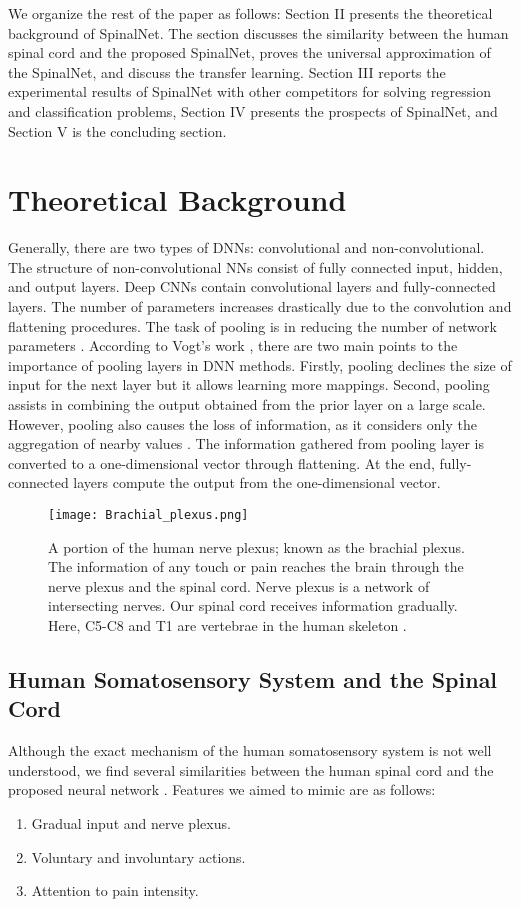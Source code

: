 \documentclass[journal]{IEEEtran}
\begin{document}
We organize the rest of the paper as follows: Section II presents the theoretical background of SpinalNet. The section discusses the similarity between the human spinal cord and the proposed SpinalNet, proves the universal approximation of the SpinalNet, and discuss the transfer learning. Section III reports the experimental results of SpinalNet with other competitors for solving regression and classification problems, Section IV presents the prospects of SpinalNet, and Section V is the concluding section.

\section{Theoretical Background}
Generally, there are two types of DNNs: convolutional and non-convolutional. The structure of non-convolutional NNs consist of fully connected input, hidden, and output layers. Deep CNNs contain convolutional layers and fully-connected layers. The number of parameters increases drastically due to the convolution and flattening procedures. The task of pooling is in reducing the number of network parameters \cite{wiatowski2017mathematical}. According to Vogt's work \cite{vogt2019overview}, there are two main points to the importance of pooling layers in DNN methods. Firstly, pooling declines the size of input for the next layer but it allows learning more mappings. Second, pooling assists in combining the output obtained from the prior layer on a large scale. However, pooling also causes the loss of information, as it considers only the aggregation of nearby values \cite{xie2015simple, vogt2019overview}. The information gathered from pooling layer is converted to a one-dimensional vector through flattening. At the end, fully-connected layers compute the output from the one-dimensional vector.

\begin{figure}
  \centering
  \texttt{[image: Brachial\_plexus.png]}
  \caption{A portion of the human nerve plexus; known as the brachial plexus. The information of any touch or pain reaches the brain through the nerve plexus and the spinal cord. Nerve plexus is a network of intersecting nerves. Our spinal cord receives information gradually. Here, C5-C8 and T1 are vertebrae in the human skeleton \cite{chang2019vascularized}.}
  \label{Hsensory}
\end{figure}

\subsection{Human Somatosensory System and the Spinal Cord}
Although the exact mechanism of the human somatosensory system is not well understood, we find several similarities between the human spinal cord and the proposed neural network \cite{d2008spinal}. Features we aimed to mimic are as follows:
\begin{enumerate}
	\item Gradual input and nerve plexus. 
	\item Voluntary and involuntary actions.
	\item Attention to pain intensity. 
\end{enumerate}
\end{document}
